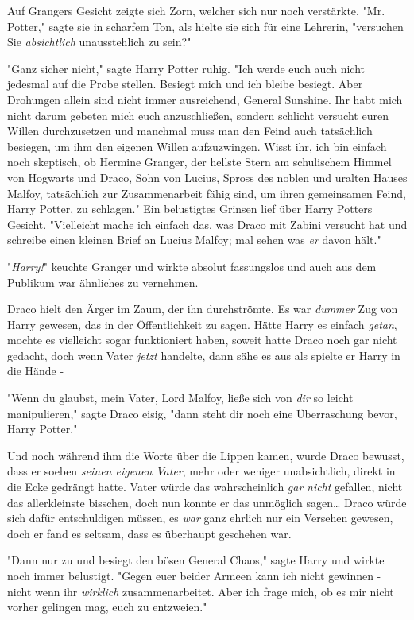 {Auf Grangers Gesicht zeigte sich Zorn, welcher sich nur noch verstärkte. "Mr. Potter," sagte sie in scharfem Ton, als hielte sie sich für eine Lehrerin, "versuchen Sie \emph{absichtlich} unausstehlich zu sein?"

"Ganz sicher nicht," sagte Harry Potter ruhig. "Ich werde euch auch nicht jedesmal auf die Probe stellen. Besiegt mich und ich bleibe besiegt. Aber Drohungen allein sind nicht immer ausreichend, General Sunshine. Ihr habt mich nicht darum gebeten mich euch anzuschließen, sondern schlicht versucht euren Willen durchzusetzen und manchmal muss man den Feind auch tatsächlich besiegen, um ihm den eigenen Willen aufzuzwingen. Wisst ihr, ich bin einfach noch skeptisch, ob Hermine Granger, der hellste Stern am schulischem Himmel von Hogwarts und Draco, Sohn von Lucius, Spross des noblen und uralten Hauses Malfoy, tatsächlich zur Zusammenarbeit fähig sind, um ihren gemeinsamen Feind, Harry Potter, zu schlagen." Ein belustigtes Grinsen lief über Harry Potters Gesicht. "Vielleicht mache ich einfach das, was Draco mit Zabini versucht hat und schreibe einen kleinen Brief an Lucius Malfoy; mal sehen was \emph{er} davon hält."

"\emph{Harry!}" keuchte Granger und wirkte absolut fassungslos und auch aus dem Publikum war ähnliches zu vernehmen.

Draco hielt den Ärger im Zaum, der ihn durchströmte. Es war \emph{dummer} Zug von Harry gewesen, das in der Öffentlichkeit zu sagen. Hätte Harry es einfach \emph{getan}, mochte es vielleicht sogar funktioniert haben, soweit hatte Draco noch gar nicht gedacht, doch wenn Vater \emph{jetzt} handelte, dann sähe es aus als spielte er Harry in die Hände -

"Wenn du glaubst, mein Vater, Lord Malfoy, ließe sich von \emph{dir} so leicht manipulieren," sagte Draco eisig, "dann steht dir noch eine Überraschung bevor, Harry Potter."

Und noch während ihm die Worte über die Lippen kamen, wurde Draco bewusst, dass er soeben \emph{seinen eigenen Vater}, mehr oder weniger unabsichtlich, direkt in die Ecke gedrängt hatte. Vater würde das wahrscheinlich \emph{gar} \emph{nicht} gefallen, nicht das allerkleinste bisschen, doch nun konnte er das unmöglich sagen… Draco würde sich dafür entschuldigen müssen, es \emph{war} ganz ehrlich nur ein Versehen gewesen, doch er fand es seltsam, dass es überhaupt geschehen war.

"Dann nur zu und besiegt den bösen General Chaos," sagte Harry und wirkte noch immer belustigt. "Gegen euer beider Armeen kann ich nicht gewinnen - nicht wenn ihr \emph{wirklich} zusammenarbeitet. Aber ich frage mich, ob es mir nicht vorher gelingen mag, euch zu entzweien."

}
